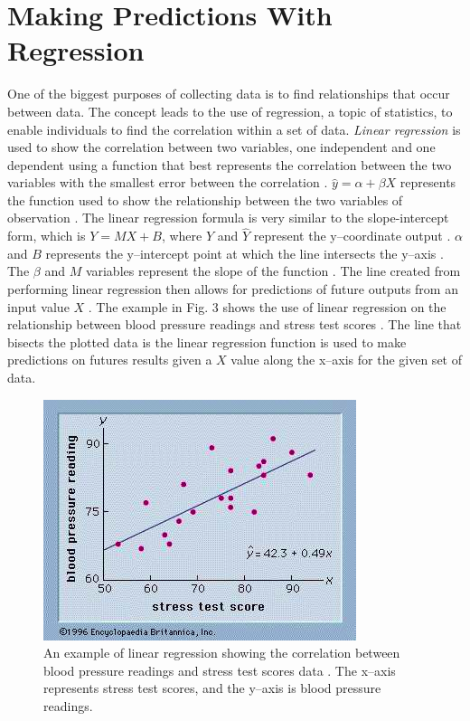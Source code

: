 \documentclass[a4paper, 12pt]{article}
\begin{document}
\section{Making Predictions With Regression}
\begin{paragraph}
\indent One of the biggest purposes of collecting data is to find relationships that occur between data. The concept leads to the use of regression, a topic of statistics, to enable individuals to find the correlation within a set of data. \textit{Linear regression} is used to show the correlation between two variables, one independent and one dependent using a function that best represents the correlation between the two variables with the smallest error between the correlation \cite{Stats2015}. $\hat{y}=\alpha+\beta X$ represents the function used to show the relationship between the two variables of observation \cite{Stats2015}. The linear regression formula is very similar to the slope-intercept form, which is $Y=MX+B$, where $Y$ and $\hat{Y}$ represent the y--coordinate output \cite{Stats2015}. $\alpha$ and $B$ represents the y--intercept point at which the line intersects the y--axis \cite{Stats2015}. The $\beta$ and $M$ variables represent the slope of the function \cite{Stats2015}. The line created from performing linear regression then allows for predictions of future outputs from an input value $X$ \cite{Stats2015}. The example in Fig. 3 shows the use of linear regression on the relationship between blood pressure readings and stress test scores \cite{LinPNG}. The line that bisects the plotted data is the linear regression function is used to make predictions on futures results given a $X$ value along the x--axis for the given set of data.

\begin{figure}[!h]
\centering
\includegraphics[scale=0.80]{LinReg}
\caption{An example of linear regression showing the correlation between blood pressure readings and stress test scores data \cite{LinPNG}. The x--axis represents stress test scores, and the y--axis is blood pressure readings.}
\end{figure}


\end{paragraph}
\end{document}

